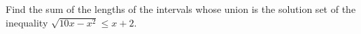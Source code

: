 Find the sum of the lengths of the intervals whose union is the solution set of the inequality $\sqrt{10x-x^{2}} \leqslant x+2$.
